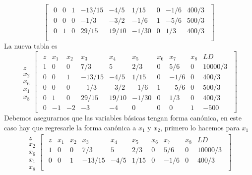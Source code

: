 \documentclass[11pt,letterpaper]{article}
\begin{document}
\begin{enumerate}
\begin{equation}
\begin{bmatrix}
\begin{array}{c||cccccccc}
  0 & 0 & 1 &-13/15 & -4/5 & 1/15 & 0 &-1/6 & 400/3  \\
  0 & 0 & 0 &-1/3 & -3/2 & -1/6 & 1 & -5/6& 500/3 \\
  0 & 1 & 0 & 29/15 & 19/10 & -1/30 & 0 & 1/3 & 400/3 \\
\end{array}
\end{bmatrix}
\end{equation}
La nueva tabla es
\begin{equation} 
\begin{array}{c}
\\
z \\ 
x_2 \\
x_6 \\
x_1\\
x_8
\end{array}
\begin{bmatrix}
\begin{array}{c||ccccccccc}
  z & x_1 & x_2 & x_3 & x_4 & x_5 & x_6 & x_7 & x_8 & LD\\ \hline \hline
  1 & 0 & 0 & 7/3 & 5 & 2/3 & 0 & 5/6 &0 & 10000/3\\ 
  0 & 0 & 1 &-13/15 & -4/5 & 1/15 & 0 &-1/6 &0& 400/3  \\
  0 & 0 & 0 &-1/3 & -3/2 & -1/6 & 1 & -5/6&0& 500/3 \\
  0 & 1 & 0 & 29/15 & 19/10 & -1/30 & 0 & 1/3 &0&400/3 \\
    0 & -1 & -2 & -3 & -4 & 0 & 0 & 0 &1&-500
\end{array}
\end{bmatrix}
\end{equation}
Debemos asegurarnos que las variables básicas tengan forma canónica, en este caso hay que regresarle la forma canónica a $x_1$ y $x_2$, primero lo hacemos para $x_1$
\begin{equation} 
\begin{array}{c}
\\
z \\ 
x_2 \\
x_6 \\
x_1\\
x_8
\end{array}
\begin{bmatrix}
\begin{array}{c||ccccccccc}
  z & x_1 & x_2 & x_3 & x_4 & x_5 & x_6 & x_7 & x_8 & LD\\ \hline \hline
  1 & 0 & 0 & 7/3 & 5 & 2/3 & 0 & 5/6 &0 & 10000/3\\ 
  0 & 0 & 1 &-13/15 & -4/5 & 1/15 & 0 &-1/6 &0& 400/3  \\

\end{array}
\end{bmatrix}
\end{equation}
\end{enumerate}
\end{document}
